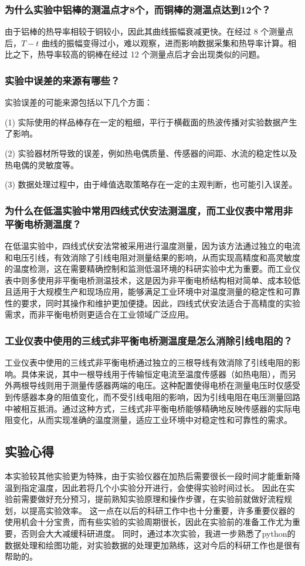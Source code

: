 \documentclass[UTF-8,twoside,cs4size]{ctexart}
\begin{document}
\subsubsection{为什么实验中铝棒的测温点才8个，而铜棒的测温点达到12个？}
由于铝棒的热导率相较于铜较小，因此其曲线振幅衰减更快。在经过 8 个测量点后，$T-t$ 曲线的振幅变得过小，难以观察，进而影响数据采集和热导率计算。相比之下，热导率较高的铜棒在经过 12 个测量点后才会出现类似的问题。

\subsubsection{实验中误差的来源有哪些？}
实验误差的可能来源包括以下几个方面：

(1) 实际使用的样品棒存在一定的粗细，平行于横截面的热波传播对实验数据产生了影响。

(2) 实验器材所导致的误差，例如热电偶质量、传感器的间距、水流的稳定性以及热电偶的灵敏度等。

(3) 数据处理过程中，由于峰值选取策略存在一定的主观判断，也可能引入误差。

\subsubsection{为什么在低温实验中常用四线式伏安法测温度，而工业仪表中常用非平衡电桥测温度？}
在低温实验中，四线式伏安法常被采用进行温度测量，因为该方法通过独立的电流和电压引线，有效消除了引线电阻对测量结果的影响，从而实现高精度和高灵敏度的温度检测，这在需要精确控制和监测低温环境的科研实验中尤为重要。而工业仪表中则多使用非平衡电桥测温技术，这是因为非平衡电桥结构相对简单、成本较低且适用于大规模生产和现场应用，能够满足工业环境中对温度测量的稳定性和可靠性的要求，同时其操作和维护更加便捷。因此，四线式伏安法适合于高精度的实验需求，而非平衡电桥则更适合在工业领域广泛应用。

\subsubsection{工业仪表中使用的三线式非平衡电桥测温度是怎么消除引线电阻的？}
工业仪表中使用的三线式非平衡电桥通过独立的三根导线有效消除了引线电阻的影响。具体来说，其中一根导线用于传输恒定电流至温度传感器（如热电阻），而另外两根导线则用于测量传感器两端的电压。这种配置使得电桥在测量电压时仅感受到传感器本身的阻值变化，而不受引线电阻的影响，因为引线电阻在电压测量回路中被相互抵消。通过这种方式，三线式非平衡电桥能够精确地反映传感器的实际电阻变化，从而实现准确的温度测量，适应工业环境中对稳定性和可靠性的需求。

\subsection{实验心得}
本实验较其他实验更为特殊，由于实验仪器在加热后需要很长一段时间才能重新降温到指定温度，因此若将几个小实验分开进行，会使得实验时间过长。
因此在实验前需要做好充分预习，提前熟知实验原理和操作步骤，在实验前就做好流程规划，以提高实验效率。
这一点在以后的科研工作中也十分重要，许多重要仪器的使用机会十分宝贵，而有些实验的实验周期很长，因此在实验前的准备工作尤为重要，否则会大大减缓科研进度。
同时，通过本次实验，我进一步熟悉了python的数据处理和绘图功能，对实验数据的处理更加熟练，这对今后的科研工作也是很有帮助的。
\end{document}
